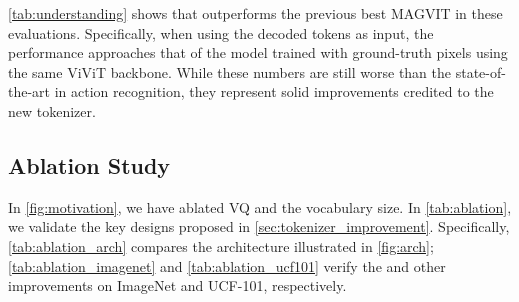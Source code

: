 \cref{tab:understanding} shows that \modelname{} outperforms the previous best MAGVIT in these evaluations. Specifically, when using the decoded tokens as input, the performance approaches that of the model trained with ground-truth pixels using the same ViViT backbone. While these numbers are still worse than the state-of-the-art in action recognition, they represent solid improvements credited to the new tokenizer.

\vspace{-2mm}
\subsection{Ablation Study}
\vspace{-2mm}
In \cref{fig:motivation}, we have ablated \quantizername{} \vs VQ and the vocabulary size.
In \cref{tab:ablation}, we validate the key designs proposed in \cref{sec:tokenizer_improvement}. Specifically, \cref{tab:ablation_arch} compares the architecture illustrated in \cref{fig:arch}; \cref{tab:ablation_imagenet} and \cref{tab:ablation_ucf101} verify the \quantizername{} and other improvements on ImageNet and UCF-101, respectively.

